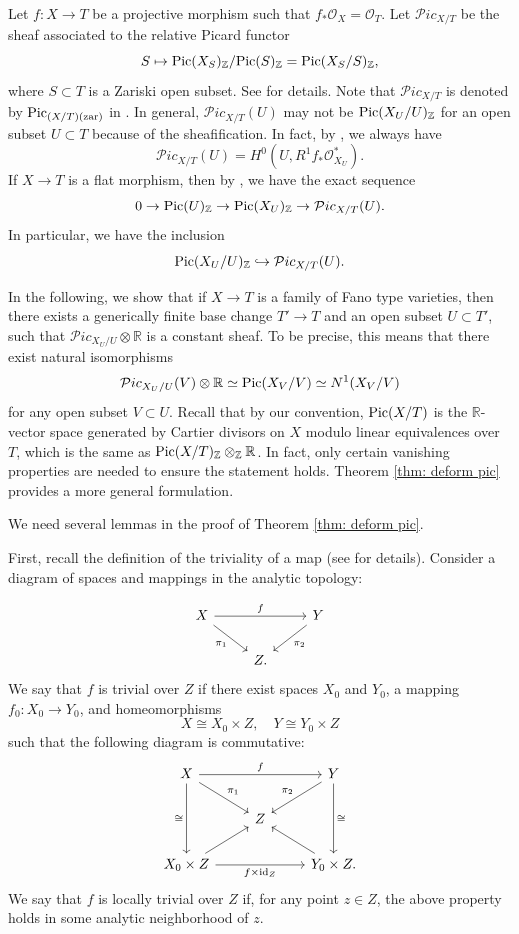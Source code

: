 \documentclass[11pt,oneside,reqno]{amsart}
\numberwithin{equation}{section}
\theoremstyle{definition}
\newcommand{\Pic}{{\rm {Pic}}}
\newcommand{\bR}{\mathbb{R}}
\newcommand{\bZ}{\mathbb{Z}}
\newcommand{\mO}{\mathcal{O}}
\newcommand{\mP}{\mathcal{P}}
\begin{document}
Let $f: X \to T$ be a projective morphism such that $f_*\mO_X =\mO_T$. Let ${\mP}ic_{X/T}$ be the sheaf associated to the relative Picard functor
\[
S \mapsto \Pic(X_S)_{\bZ}/\Pic(S)_{\bZ}=\Pic(X_S/S)_{\bZ},
\] where $S\subset T$ is a Zariski open subset. See \cite[\S 9.2]{Kle05} for details. Note that ${\mP}ic_{X/T}$ is denoted by $\Pic_{(X/T)(\rm{zar})}$ in \cite[Definition 9.2.2]{Kle05}. In general, ${\mP}ic_{X/T}(U)$ may not be $\Pic(X_U/U)_{\bZ}$ for an open subset $U\subset T$ because of the sheafification. In fact, by \cite[(9.2.11.2)]{Kle05}, we always have
\begin{equation}\label{eq: R1}
{\mP}ic_{X/T}(U) = H^0(U, R^1f_*\mO^*_{X_U}).
\end{equation} If $X \to T$ is a flat morphism, then by \cite[(9.2.11.3)]{Kle05}, we have the exact sequence
\[
0 \to \Pic(U)_{\bZ} \to \Pic(X_U)_{\bZ} \to {\mP}ic_{X/T}(U). 
\] In particular, we have the inclusion 
\begin{equation}\label{eq: inclusion of Pic to functor}
\Pic(X_U/U)_{\bZ} \hookrightarrow {\mP}ic_{X/T}(U).
\end{equation} 


In the following, we show that if $X\to T$ is a family of Fano type varieties, then there exists a generically finite base change $T' \to T$ and an open subset $U\subset T'$, such that ${\mP}ic_{X_U/U} \otimes \bR$ is a constant sheaf. To be precise, this means that there exist natural isomorphisms
\[
{\mP}ic_{X_U/U}(V) \otimes \bR \simeq  \Pic(X_V/V) \simeq N^1(X_V/V)
\] for any open subset $V\subset U$. Recall that by our convention, $\Pic(X/T)$ is the $\bR$-vector space generated by Cartier divisors on $X$ modulo linear equivalences over $T$, which is the same as $\Pic(X/T)_{\bZ}\otimes_{\bZ} \bR$. In fact, only certain vanishing properties are needed to ensure the statement holds. Theorem \ref{thm: deform pic} provides a more general formulation.

We need several lemmas in the proof of Theorem \ref{thm: deform pic}.



First, recall the definition of the triviality of a map (see \cite[\S 11]{Mat22} for details). Consider a diagram of spaces and mappings in the analytic topology:

\[
\begin{tikzcd}
X \arrow[rr, "f"] \arrow[dr, "\pi_1"'] & & Y \arrow[dl, "\pi_2"] \\
& Z. &
\end{tikzcd}
\]
We say that $f$ is trivial over $Z$ if there exist spaces $X_0$ and $Y_0$, a mapping $f_0: X_0 \to Y_0$, and homeomorphisms 
\[
X \cong X_0 \times Z, \quad Y \cong Y_0 \times Z
\]
such that the following diagram is commutative:
\[
\begin{tikzcd}
X \arrow[rr, "f"] \arrow[dd, "\cong"'] \arrow[dr, "\pi_1"] & & Y \arrow[dd, "\cong"] \arrow[dl, "\pi_2", swap] \\
& Z &\\
X_0 \times Z \arrow[rr, "f \times \mathrm{id}_Z"'] \arrow[ru] && Y_0 \times Z. \arrow[ul]
\end{tikzcd}
\]
We say that $f$ is locally trivial over $Z$ if, for any point $z \in Z$, the above property holds in some analytic neighborhood of $z$.
\end{document}
